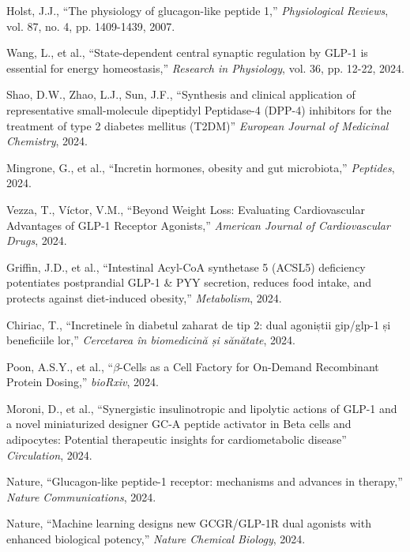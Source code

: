 \documentclass[9pt,shortpaper,twoside,web]{ieeecolor}
\begin{document}
\begin{thebibliography}{00}
Holst, J.J., ``The physiology of glucagon-like peptide 1,'' \textit{Physiological Reviews}, vol. 87, no. 4, pp. 1409-1439, 2007.

Wang, L., et al., ``State-dependent central synaptic regulation by GLP-1 is essential for energy homeostasis,'' \textit{Research in Physiology}, vol. 36, pp. 12-22, 2024. 

Shao, D.W., Zhao, L.J., Sun, J.F., ``Synthesis and clinical application of representative small-molecule dipeptidyl Peptidase-4 (DPP-4) inhibitors for the treatment of type 2 diabetes mellitus (T2DM)'' \textit{European Journal of Medicinal Chemistry}, 2024. 

Mingrone, G., et al., ``Incretin hormones, obesity and gut microbiota,'' \textit{Peptides}, 2024.

Vezza, T., Víctor, V.M., ``Beyond Weight Loss: Evaluating Cardiovascular Advantages of GLP-1 Receptor Agonists,'' \textit{American Journal of Cardiovascular Drugs}, 2024. 

Griffin, J.D., et al., ``Intestinal Acyl-CoA synthetase 5 (ACSL5) deficiency potentiates postprandial GLP-1 \& PYY secretion, reduces food intake, and protects against diet-induced obesity,'' \textit{Metabolism}, 2024. 

Chiriac, T., ``Incretinele în diabetul zaharat de tip 2: dual agoniștii gip/glp-1 și beneficiile lor,'' \textit{Cercetarea în biomedicină și sănătate}, 2024. 

Poon, A.S.Y., et al., ``$\beta$-Cells as a Cell Factory for On-Demand Recombinant Protein Dosing,'' \textit{bioRxiv}, 2024. 

Moroni, D., et al., ``Synergistic insulinotropic and lipolytic actions of GLP-1 and a novel miniaturized designer GC-A peptide activator in Beta cells and adipocytes: Potential therapeutic insights for cardiometabolic disease'' \textit{Circulation}, 2024.

Nature, ``Glucagon-like peptide-1 receptor: mechanisms and advances in therapy,'' \textit{Nature Communications}, 2024.

Nature, ``Machine learning designs new GCGR/GLP-1R dual agonists with enhanced biological potency,'' \textit{Nature Chemical Biology}, 2024.


\end{thebibliography}
\end{document}
